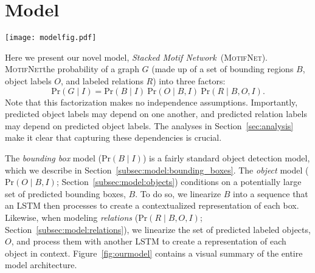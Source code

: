 \documentclass[10pt,twocolumn,letterpaper]{article}
\newcommand{\model}{\textsc{MotifNet}}
\newcommand{\modellong}{Stacked Motif Network}
\newcommand{\p}[1]{\textrm{Pr}( #1 )}  %
\newcommand{\term}[1]{\emph{#1}}  %
\begin{document}
\section{Model}
\label{sec:model}
\begin{figure*}[t]
    \vspace{-3mm}
    \centering
    \texttt{[image: modelfig.pdf]}
    \caption{A diagram of a \modellong~ (\model). The model breaks scene graph parsing into stages predicting bounding regions, labels for regions, and then relationships. Between each stage, global context is computed using bidirectional LSTMs and is then used for subsequent stages. In the first stage, a detector proposes bounding regions and then contextual information among bounding regions is computed and propagated (object context). The global context is used to predict labels for bounding boxes. Given bounding boxes and labels, the model constructs a new representation (edge context) that gives global context for edge predictions. Finally, edges are assigned labels by combining contextualized head, tail, and union bounding region information with an outer product.\vspace{-1mm}}
    \label{fig:ourmodel}

\end{figure*}

Here we present our novel model, \term{\modellong}~(\model).
\model\decomposes the probability of a graph $G$ (made up of a set of bounding regions $B$, object labels $O$, and labeled relations $R$) into three factors:
\begin{equation}
\p{G \mid I} = \p{B \mid I} \ \p{O \mid B, I} \ \p{R \mid B, O, I}.
\end{equation}
Note that this factorization makes no independence assumptions.
Importantly, predicted object labels may depend on one another, and predicted relation labels may depend on predicted object labels.
The analyses in Section~\ref{sec:analysis} make it clear that capturing these dependencies is crucial.

The \emph{bounding box} model ($\p{B \mid I}$) is a fairly standard object detection model, which we describe in Section~\ref{subsec:model:bounding_boxes}.
The \emph{object} model ($\p{O \mid B, I}$; Section~\ref{subsec:model:objects}) conditions on a potentially large set of predicted bounding boxes, $B$.
To do so, we linearize $B$ into a sequence that an LSTM then processes to create a contextualized representation of each box.
Likewise, when modeling \emph{relations} ($\p{R \mid B, O, I}$; Section~\ref{subsec:model:relations}), we linearize the set of predicted labeled objects, $O$, and process them with another LSTM to create a representation of each object in context.
Figure~\ref{fig:ourmodel} contains a visual summary of the entire model architecture.
\end{document}
